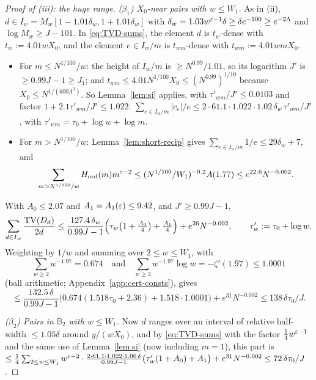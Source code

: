 \begin{proof}[Proof of (iii): the huge range]
\emph{($\beta_1$) $X_0$-near pairs with $w\le W_1$.} As in (ii), $d\in I_w=M_w[1-1.01\delta_w,1+1.01\delta_w]$ with
$\delta_w=1.03w^{\varepsilon-1}\delta\ge\delta e^{-100}\ge e^{-2\Lambda}$ and $\log M_w\ge J-101$. In \eqref{eq:TVD-sums}, the
element $d$ is $t_w$-dense with $t_w:=4.01wX_0$, and the element $e\in I_w/m$ is $t_{wm}$-dense with $t_{wm}:=4.01wmX_0$.
\begin{itemize}
\item For $m\le N^{1/100}/w$: the height of $I_w/m$ is $\ge N^{0.99}/1.01$, so its logarithm $J'$ is $\ge0.99J-1\ge J_1$;
  and $t_{wm}\le4.01N^{1/100}X_0\le(N^{0.99})^{1/10}$ because $X_0\le N^{1/(600\Lambda^3)}$. So Lemma~\ref{lem:si} applies, with
  $\tau'_{wm}/J'\le0.0103$ and factor $1+2.1\tau'_{wm}/J'\le1.022$:
  $\sum_{e\in I_w/m}|c_e|/e\le2\cdot61.1\cdot1.022\cdot1.02\,\delta_w\,\tau'_{wm}/J'$, with $\tau'_{wm}=\tau_0+\log w+\log m$.
\item For $m>N^{1/100}/w$: Lemma~\ref{lem:short-recip} gives $\sum_{e\in I_w/m}1/e\le29\delta_w+7$, and
  \[
    \sum_{m>N^{1/100}/w}H_{\mathrm{ord}}(m)m^{\varepsilon-2}\le(N^{1/100}/W_1)^{-0.2}A(1.77)\le e^{22.6}N^{-0.002}.
  \]
\end{itemize}
With $A_0\le2.07$ and $A_1=A_1(\varepsilon)\le9.42$, and $J'\ge0.99J-1$,
\[
  \sum_{d\in I_w}\frac{\operatorname{TV}(D_d)}{2d}\le\frac{127.4\,\delta_w}{0.99J-1}\Bigl(\tau_w\bigl(1+\tfrac{A_0}4\bigr)+\tfrac{A_1}4\Bigr)
  +e^{26}N^{-0.002},\qquad \tau'_w:=\tau_0+\log w .
\]
Weighting by $1/w$ and summing over $2\le w\le W_1$, with
\[
  \sum_{w\ge2}w^{-1.97}=0.674\quad\text{and}\quad\sum_{w\ge2}w^{-1.97}\log w=-\zeta'(1.97)\le1.0001
\]
(ball arithmetic; Appendix~\ref{app:cert-consts}), gives
\[
  \le\frac{132.5\,\delta}{0.99J-1}\bigl(0.674(1.518\tau_0+2.36)+1.518\cdot1.0001\bigr)+e^{31}N^{-0.002}\le138\,\delta\tau_0/J.
\]

\emph{($\beta_2$) Pairs in $\mathbb B_2$ with $w\le W_1$.} Now $d$ ranges over an interval of relative half-width
$\le1.05\delta$ around $y/(wX_0)$, and by \eqref{eq:TVD-sums} with the factor $\frac14w^{\varepsilon-1}$ and the same use of
Lemma~\ref{lem:si} (now including $m=1$),
this part is $\le\frac14\sum_{2\le w\le W_1}w^{\varepsilon-2}\cdot\frac{2\cdot61.1\cdot1.022\cdot1.06\,\delta}{0.99J-1}
\bigl(\tau'_w(1+A_0)+A_1\bigr)+e^{31}N^{-0.002}\le72\,\delta\tau_0/J$.


\end{proof}
